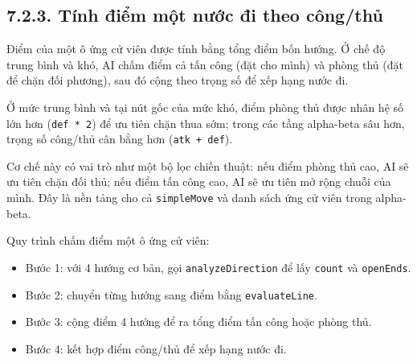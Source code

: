 \subsection*{7.2.3. Tính điểm một nước đi theo công/thủ}

\setlength{\parindent}{1.5em} Điểm của một ô ứng cử viên được tính bằng tổng điểm bốn hướng. Ở chế độ trung bình và khó, AI chấm điểm cả tấn công (đặt cho mình) và phòng thủ (đặt để chặn đối phương), sau đó cộng theo trọng số để xếp hạng nước đi.

\setlength{\parindent}{1.5em} Ở mức trung bình và tại nút gốc của mức khó, điểm phòng thủ được nhân hệ số lớn hơn (\texttt{def * 2}) để ưu tiên chặn thua sớm; trong các tầng alpha-beta sâu hơn, trọng số công/thủ cân bằng hơn (\texttt{atk + def}).

\setlength{\parindent}{1.5em} Cơ chế này có vai trò như một bộ lọc chiến thuật: nếu điểm phòng thủ cao, AI sẽ ưu tiên chặn đối thủ; nếu điểm tấn công cao, AI sẽ ưu tiên mở rộng chuỗi của mình. Đây là nền tảng cho cả \texttt{simpleMove} và danh sách ứng cử viên trong alpha-beta.

\setlength{\parindent}{1.5em} Quy trình chấm điểm một ô ứng cử viên:
\begin{itemize}
	\item Bước 1: với 4 hướng cơ bản, gọi \texttt{analyzeDirection} để lấy \texttt{count} và \texttt{openEnds}.
	\item Bước 2: chuyển từng hướng sang điểm bằng \texttt{evaluateLine}.
	\item Bước 3: cộng điểm 4 hướng để ra tổng điểm tấn công hoặc phòng thủ.
	\item Bước 4: kết hợp điểm công/thủ để xếp hạng nước đi.
\end{itemize}

